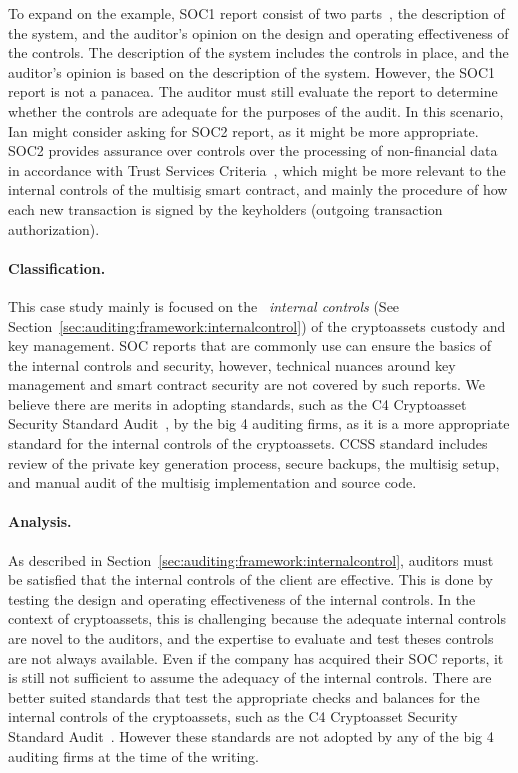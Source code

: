 To expand on the example, SOC1 report consist of two parts~\cite{RCGTsocreport}, the description of the system, and the auditor's opinion on the design and operating effectiveness of the controls. The description of the system includes the controls in place, and the auditor's opinion is based on the description of the system. However, the SOC1 report is not a panacea. The auditor must still evaluate the report to determine whether the controls are adequate for the purposes of the audit. In this scenario, Ian might consider asking for SOC2 report, as it might be more appropriate. SOC2 provides assurance over controls over the processing of non-financial data in accordance with Trust Services Criteria~\cite{bdosocreports}, which might be more relevant to the internal controls of the multisig smart contract, and mainly the procedure of how each new transaction is signed by the keyholders (\eg outgoing transaction authorization). 

\paragraph{Classification.} This case study mainly is focused on the ~\textit{internal controls} (See Section~\ref{sec:auditing:framework:internalcontrol}) of the cryptoassets custody and key management. SOC reports that are commonly use can ensure the basics of the internal controls and security, however, technical nuances around key management and smart contract security are not covered by such reports. We believe there are merits in adopting standards, such as the C4 Cryptoasset Security Standard Audit~\cite{c4ccssa}, by the big 4 auditing firms, as it is a more appropriate standard for the internal controls of the cryptoassets. CCSS standard includes review of the private key generation process, secure backups, the multisig setup, and manual audit of the multisig implementation and source code. 

\paragraph{Analysis.} As described in Section~\ref{sec:auditing:framework:internalcontrol}, auditors must be satisfied that the internal controls of the client are effective. This is done by testing the design and operating effectiveness of the internal controls. In the context of cryptoassets, this is challenging because the adequate internal controls are novel to the auditors, and the expertise to evaluate and test theses controls are not always available. Even if the company has acquired their SOC reports, it is still not sufficient to assume the adequacy of the internal controls. There are better suited standards that test the appropriate checks and balances for the internal controls of the cryptoassets, such as the C4 Cryptoasset Security Standard Audit~\cite{c4ccssa}. However these standards are not adopted by any of the big 4 auditing firms at the time of the writing. 


